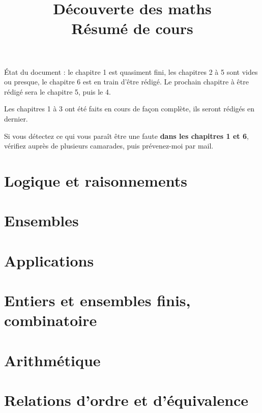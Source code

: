 \documentclass[10pt,a4paper]{book}
\theoremstyle{definition}
\begin{document}
\title{Découverte des maths\\
Résumé de cours}
\maketitle

\'Etat du document : le chapitre 1 est quasiment fini, les chapitres 2 à 5 sont vides ou presque, le chapitre 6 est en train d'être rédigé. Le prochain chapitre à être rédigé sera le chapitre 5, puis le 4.


Les chapitres 1 à 3 ont été faits en cours de façon complète, ils seront rédigés en dernier.

Si vous détectez ce qui vous paraît être une faute \textbf{dans les chapitres 1 et 6}, vérifiez auprès de plusieurs camarades, puis prévenez-moi par mail.

\tableofcontents





\chapter{Logique et raisonnements}


\chapter{Ensembles}


\chapter{Applications}


\chapter{Entiers et ensembles finis, combinatoire}


\chapter{Arithmétique}


\chapter{Relations d'ordre et d'équivalence}

\end{document}
